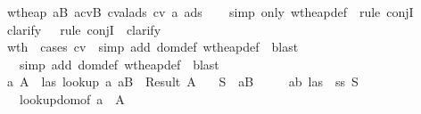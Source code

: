 \begin{isabellebody}
\ \ \ {\isachardoublequoteopen}wt{\isacharunderscore}heap\ {\isacharparenleft}{\isacharparenleft}a{\isacharcomma}B{\isacharparenright}{\isacharhash}{\isasymSigma}{\isacharparenright}\ {\isacharparenleft}{\isacharparenleft}a{\isacharcomma}{\isacharparenleft}cv{\isacharcomma}B{\isacharparenright}{\isacharparenright}{\isacharhash}{\isasymmu}{\isacharparenright}\ {\isacharparenleft}cval{\isacharunderscore}ads\ cv\ a\ ads{\isacharparenright}{\isachardoublequoteclose}\isanewline
\isadelimproof
\ \ \endisadelimproof
\isatagproof
{}\isamarkupfalse \ {\isacharparenleft}simp\ only{\isacharcolon}\ wt{\isacharunderscore}heap{\isacharunderscore}def{\isacharparenright}\ \isamarkupfalse \ {\isacharparenleft}rule\ conjI{\isacharparenright}\isanewline
\ \ \isamarkupfalse \ clarify\ \isamarkupfalse \ \isamarkupfalse \ {\isacharparenleft}rule\ conjI{\isacharparenright}\ \isamarkupfalse \ clarify\ \isamarkupfalse \isanewline
\ \ \isamarkupfalse \ wth\ \isamarkupfalse \ {\isacharparenleft}cases\ cv{\isacharparenright}\ \isamarkupfalse \ {\isacharparenleft}simp\ add{\isacharcolon}\ dom{\isacharunderscore}def\ wt{\isacharunderscore}heap{\isacharunderscore}def{\isacharparenright}\ \isamarkupfalse \ blast\isanewline
\ \ \ \ \isamarkupfalse \ {\isacharparenleft}simp\ add{\isacharcolon}\ dom{\isacharunderscore}def\ wt{\isacharunderscore}heap{\isacharunderscore}def{\isacharparenright}\ \isamarkupfalse \ blast\isanewline
{}\isamarkupfalse \ {\isacharminus}\isanewline
\ \ \isamarkupfalse \ a{\isacharprime}\ A{\isacharprime}\ \isamarkupfalse \ las{}{\isacharcolon}\ {\isachardoublequoteopen}lookup\ a{\isacharprime}\ {\isacharparenleft}{\isacharparenleft}a{\isacharcomma}B{\isacharparenright}{\isacharhash}{\isasymSigma}{\isacharparenright}\ {\isacharequal}\ Result\ A{\isacharprime}{\isachardoublequoteclose}\isanewline
\ \ \isamarkupfalse \ {\isacharquery}S{}\ {\isacharequal}\ {\isachardoublequoteopen}{\isacharparenleft}a{\isacharcomma}B{\isacharparenright}\ {\isacharhash}\ {\isasymSigma}{\isachardoublequoteclose}\isanewline
\ \ \isamarkupfalse \ ab\ las\ \isamarkupfalse \ ss{\isacharcolon}\ {\isachardoublequoteopen}{\isacharquery}S{}\ {\isasymsqsubseteq}\ {\isasymSigma}{\isachardoublequoteclose}\isanewline
\ \ \ \ \isamarkupfalse \ lookup{\isacharunderscore}dom{\isacharbrackleft}of\ a\ {\isasymSigma}\ A{\isacharbrackright}\isanewline

\end{isabellebody}
